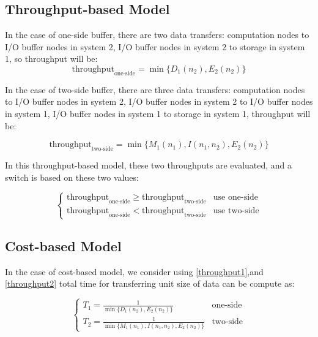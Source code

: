 \subsection{Throughput-based Model}
In the case of one-side buffer, there are two data transfers: computation nodes to I/O buffer nodes in system 2, I/O buffer nodes in system 2 to storage in system 1, so throughput will be:
\begin{equation}
	\text{throughput}_{\text{one-side}}=\min\{D_1(n_2),E_2(n_2)\} \label{throughput1}
\end{equation}

In the case of two-side buffer, there are three data transfers: computation nodes to I/O buffer nodes in system 2, I/O buffer nodes in system 2 to I/O buffer nodes in system 1, I/O buffer nodes in system 1 to storage in system 1, throughput will be:

\begin{equation}
	\text{throughput}_{\text{two-side}}=\min\{M_1(n_1),I(n_1,n_2),E_2(n_2)\} \label{throughput2}
\end{equation}

In this throughput-based model, these two throughputs are evaluated, and a switch is based on these two values:

\begin{equation}
	\begin{cases}
		\text{throughput}_{\text{one-side}} \geq \text{throughput}_{\text{two-side}} & \text{use one-side}\\
		\text{throughput}_{\text{one-side}} < \text{throughput}_{\text{two-side}} & \text{use two-side}
	\end{cases}
\end{equation}

\subsection{Cost-based Model}
In the case of cost-based model, we consider
using \ref{throughput1},and \ref{throughput2} total time for transferring unit size of data can be compute as:

\begin{equation}
	\begin{cases}
		T_1=\frac{1}{\min\{D_1(n_2),E_2(n_2)\}} & \text{one-side}\\
		T_2=\frac{1}{\min\{M_1(n_1),I(n_1,n_2),E_2(n_2)\}} &\text{two-side}
	\end{cases}
\end{equation}

